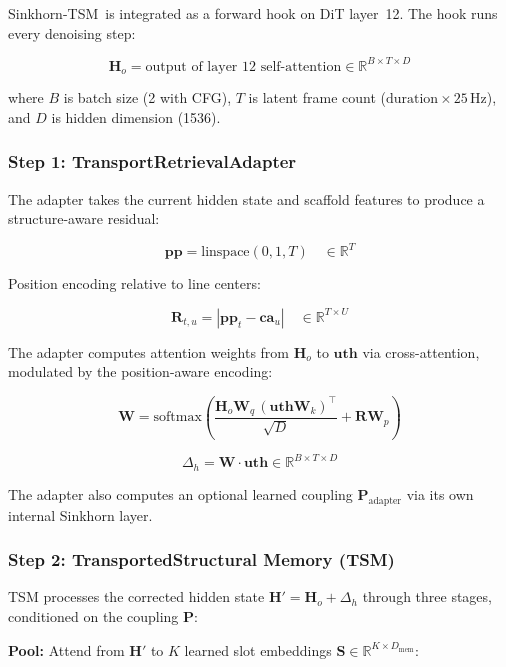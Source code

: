 \documentclass[11pt,a4paper]{article}
\newcommand{\method}{Sinkhorn-TSM}
\begin{document}
\method~is integrated as a forward hook on DiT layer~12. The hook runs every denoising step:

\begin{equation}
\mathbf{H}_o = \text{output of layer~12 self-attention} \in \mathbb{R}^{B \times T \times D}
\end{equation}

where $B$ is batch size (2 with CFG), $T$ is latent frame count ($\text{duration} \times 25$\,Hz), and $D$ is hidden dimension (1536).

\subsubsection{Step 1: TransportRetrievalAdapter}

The adapter takes the current hidden state and scaffold features to produce a structure-aware residual:

\begin{equation}
\mathbf{pp} = \text{linspace}(0, 1, T) \quad \in \mathbb{R}^T
\end{equation}

Position encoding relative to line centers:

\[
\mathbf{R}_{t,u} = |\mathbf{pp}_t - \mathbf{ca}_u| \quad \in \mathbb{R}^{T \times U}
\]

The adapter computes attention weights from $\mathbf{H}_o$ to $\mathbf{uth}$ via cross-attention, modulated by the position-aware encoding:

\[
\mathbf{W} = \text{softmax}\left(\frac{\mathbf{H}_o \mathbf{W}_q \, (\mathbf{uth} \mathbf{W}_k)^\top}{\sqrt{D}} + \mathbf{R} \mathbf{W}_p \right)
\]

\[
\Delta_h = \mathbf{W} \cdot \mathbf{uth} \in \mathbb{R}^{B \times T \times D}
\]

The adapter also computes an optional learned coupling $\mathbf{P}_{\text{adapter}}$ via its own internal Sinkhorn layer.

\subsubsection{Step 2: TransportedStructural Memory (TSM)}

TSM processes the corrected hidden state $\mathbf{H}' = \mathbf{H}_o + \Delta_h$ through three stages, conditioned on the coupling $\mathbf{P}$:

\textbf{Pool:} Attend from $\mathbf{H}'$ to $K$ learned slot embeddings $\mathbf{S} \in \mathbb{R}^{K \times D_{\text{mem}}}$:
\end{document}
